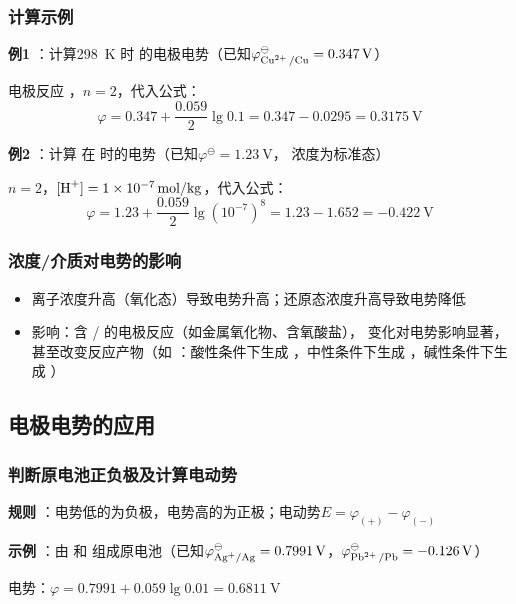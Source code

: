\subsubsection{计算示例} 
\textbf{例1} ：计算\qty{298}{\kelvin} 时  的电极电势（已知\( \varphi_{ \ce{Cu^{2+} /Cu} } ^\ominus = \qty{0.347}{\volt}  \)）

电极反应  ，\( n=2 \)，代入公式：
\[
\varphi = 0.347 + \frac{0.059}{2} \lg 0.1 = 0.347 - 0.0295 = \qty{0.3175}{\volt} 
\]

\textbf{例2} ：计算  在  时的电势（已知\( \varphi^\ominus = \qty{1.23}{\volt}  \)，  浓度为标准态）

\( n=2 \)，\(  \ce{[H+]}  = \qty{1e-7}{\mol\per\kilo\gram}  \)，代入公式：
\[
\varphi = 1.23 + \frac{0.059}{2} \lg (10^{-7} )^8 = 1.23 - 1.652 = \qty{-0.422}{\volt} 
\]

\subsubsection{浓度/介质对电势的影响} 
\begin{itemize} 
    \item 离子浓度升高（氧化态）导致电势升高；还原态浓度升高导致电势降低
    \item  {} 影响：含  /  的电极反应（如金属氧化物、含氧酸盐），  变化对电势影响显著，甚至改变反应产物（如  ：酸性条件下生成  ，中性条件下生成  ，碱性条件下生成  ）
\end{itemize} 

\subsection{电极电势的应用} 

\subsubsection{判断原电池正负极及计算电动势} 
\textbf{规则} ：电势低的为负极，电势高的为正极；电动势\( E = \varphi_{(+)}  - \varphi_{(-)}  \)

\textbf{示例} ：由  和  组成原电池（已知\( \varphi_{ \ce{Ag+/Ag} } ^\ominus = \qty{0.7991}{\volt}  \)，\( \varphi_{ \ce{Pb^{2+} /Pb} } ^\ominus = \qty{-0.126}{\volt}  \)）

  电势：\( \varphi = 0.7991 + 0.059\lg 0.01 = \qty{0.6811}{\volt}  \)

